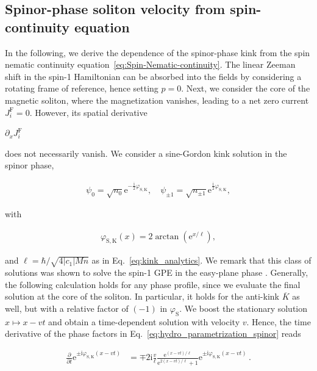 \documentclass[aps,

               pra,
               twocolumn,
               amsmath,
               amssymb,
               superscriptaddress,
               reprint,
               10pt
              ]{revtex4-2}
\newcommand{\phis}{\varphi_\mathrm{S}}
\newcommand{\e}{\mathrm{e}}
\begin{document}
\begin{appendix}
\subsection{Spinor-phase soliton velocity from spin-continuity equation}
In the following, we derive the dependence of the spinor-phase kink from the spin nematic continuity equation~\eqref{eq:Spin-Nematic-continuity}.
The linear Zeeman shift in the spin-1 Hamiltonian can be absorbed into the fields by considering a rotating frame of reference, hence setting $p=0$. Next, we consider the core of the magnetic soliton, where the magnetization vanishes, leading to a net zero current ${J}_i^\mathrm{F} = 0$. However, its spatial derivative

$\partial_x{J}_i^\mathrm{F}$

does not necessarily vanish.
We consider a sine-Gordon kink solution in the spinor phase,

\begin{align}
    \psi_{0} = \sqrt{n_{0}}\e^{- \frac{\mathrm{i}}{2} \varphi_{\mathrm{S},\mathrm{K}}},
    \quad \psi_{\pm1} = \sqrt{n_{\pm1}}\e^{\frac{\mathrm{i}}{2} \varphi_{\mathrm{S},\mathrm{K}}},
    \label{eq:hydro_parametrization_spinor}
\end{align}

with

\begin{align}
    \varphi_{\mathrm{S},\mathrm{K}}(x) = 2 \arctan{(\e^{x/\ell})}, \label{eq:BlakieLösung}
\end{align}

and $\ell = \hbar/\sqrt{4|c_1|Mn}$ as in Eq.~\eqref{eq:kink_analytics}. We remark that this class of solutions was shown to solve the spin-1 GPE in the easy-plane phase \cite{Yu2021}. Generally, the following calculation holds for any phase profile, since we evaluate the final solution at the core of the soliton. In particular, it holds for the anti-kink $\overline{K}$ as well, but with a relative factor of $(-1)$ in $\phis$.
We boost the stationary solution $x \mapsto x - vt$ and obtain a time-dependent solution with velocity $v$. Hence, the time derivative of the phase factors in Eq.~\eqref{eq:hydro_parametrization_spinor} reads

\begin{align}
    \frac{\partial }{\partial t} \e^{\pm \mathrm{i} \varphi_{\mathrm{S}, \mathrm{K}}(x -vt)} &= \mp 2\mathrm{i} \frac{v}{\ell} \frac{\e^{(x-vt)/\ell}}{\e^{2(x-vt)/\ell} + 1} \e^{\pm \mathrm{i} \varphi_{\mathrm{S}, \mathrm{K}}(x-vt)} \, .
\label{eq:der_arctan}
\end{align}


\end{appendix}
\end{document}
